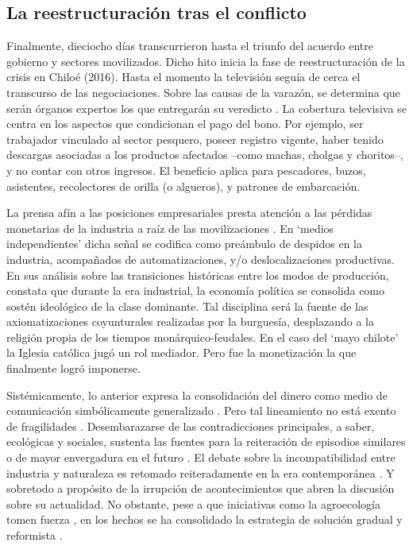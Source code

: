 \documentclass{textolivre}
\begin{document}
\subsection{La reestructuración tras el conflicto}\label{sec-reestr-conflicto}

Finalmente, dieciocho días transcurrieron hasta el triunfo del acuerdo entre
gobierno y sectores movilizados. Dicho hito inicia la fase de reestructuración de la crisis
en Chiloé (2016). Hasta el momento la televisión seguía de cerca el transcurso de las
negociaciones. Sobre las causas de la varazón, se determina que serán órganos expertos
los que entregarán su veredicto \cite{24horasb}. La cobertura televisiva se centra en
los aspectos que condicionan el pago del bono. Por ejemplo, ser trabajador vinculado al
sector pesquero, poseer registro vigente, haber tenido descargas asociadas a los
productos afectados --como machas, cholgas y choritos--, y no contar con otros
ingresos. El beneficio aplica para pescadores, buzos, asistentes, recolectores de orilla (o
algueros), y patrones de embarcación.

La prensa afín a las posiciones empresariales presta atención a las pérdidas
monetarias de la industria a raíz de las movilizaciones \cite{emol,salmonexpert}.
En ‘medios independientes’ dicha señal se codifica como preámbulo de despidos
en la industria, acompañados de automatizaciones, y/o deslocalizaciones productivas. En
sus análisis sobre las transiciones históricas entre los modos de producción, \textcite{marx2010}
constata que durante la era industrial, la economía política se consolida como sostén
ideológico de la clase dominante. Tal disciplina será la fuente de las axiomatizaciones
coyunturales realizadas por la burguesía, desplazando a la religión propia de los tiempos
monárquico-feudales. En el caso del ‘mayo chilote’ la Iglesia católica jugó un rol mediador.
Pero fue la monetización la que finalmente logró imponerse.

Sistémicamente, lo anterior expresa la consolidación del dinero como medio de
comunicación simbólicamente generalizado \cite{becerra2013,Luhmann1991}.
Pero tal lineamiento no está exento de fragilidades \cite{Habermas2006}.
Desembarazarse de las contradicciones principales, a saber, ecológicas y sociales,
sustenta las fuentes para la reiteración de episodios similares o de mayor envergadura en
el futuro \cite{Folke2016,greenpeace}. El debate sobre la incompatibilidad entre
industria y naturaleza es retomado reiteradamente en la era contemporánea \cite{ciudadano2016,Foster2016}.
Y sobretodo a propósito de la irrupción de
acontecimientos que abren la discusión sobre su actualidad. No obstante, pese a que
iniciativas como la agroecología tomen fuerza \cite{arboleda}, en los hechos se ha
consolidado la estrategia de solución gradual y reformista \cite{rios2016}.
\end{document}
